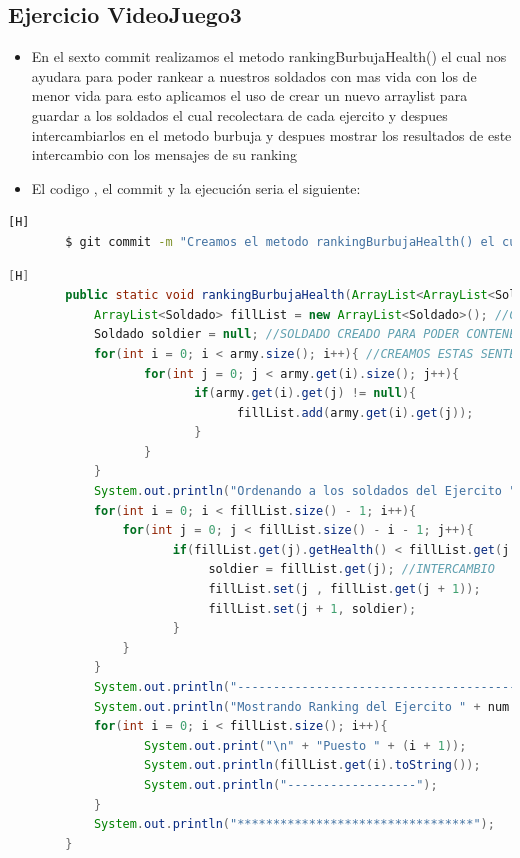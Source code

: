 \documentclass{article}
\begin{document}
	\subsection{Ejercicio VideoJuego3}
	\begin{itemize}	
		\item En el sexto commit realizamos el metodo rankingBurbujaHealth() el cual nos ayudara para poder rankear a nuestros soldados con mas vida con los de menor vida para esto aplicamos el uso de crear un nuevo arraylist para guardar a los soldados el cual recolectara de cada ejercito y despues intercambiarlos en el metodo burbuja y despues mostrar los resultados de este intercambio con los mensajes de su ranking 
		\item El codigo , el commit  y la ejecución seria el siguiente:
	\end{itemize}	
	\begin{lstlisting}[language=bash,caption={Commit}][H]
		$ git commit -m "Creamos el metodo rankingBurbujaHealth() el cual nos ayudara para poder rankear a nuestros soldados con mas vida con los de menor vida para esto aplicamos el uso de crear un nuevo arraylist para guardar a los soldados y despues intercambiarlos en el metodo burbuja y despues mostrar los resultados de este intercambio con los mensajes de su ranking
	\end{lstlisting}	
	\begin{lstlisting}[language=java,caption={Las lineas de codigos del metodo creado:}][H]
		public static void rankingBurbujaHealth(ArrayList<ArrayList<Soldado>> army, int num){
			ArrayList<Soldado> fillList = new ArrayList<Soldado>(); //CREAMOS ESTE ARRAYLIST PARA PODER GUARDAR A LOS SOLDADOS EN UN SOLO ARRAYLIST EL CUAL SEA EFECTIVO EL METODO BURBUJA 
			Soldado soldier = null; //SOLDADO CREADO PARA PODER CONTENER EL INTERCAMBIO ENTRE SOLDADOS EN EL METODO BURBUJA
			for(int i = 0; i < army.size(); i++){ //CREAMOS ESTAS SENTENCIAS PARA PODER VERIFICAR EL NUMERO DE SOLDADOS PARA DESPUES PONER EL RANKING DE PUESTOS DE CADA UNO DE ESTOS SOLDADOS
				   for(int j = 0; j < army.get(i).size(); j++){
						  if(army.get(i).get(j) != null){
								fillList.add(army.get(i).get(j));
						  }
				   }
			}
			System.out.println("Ordenando a los soldados del Ejercito " + num + " por el metodo burbuja: "); //APLICAMOS EL METODO BURBUJA CON LOS PUNTOS DE VIDA
			for(int i = 0; i < fillList.size() - 1; i++){
				for(int j = 0; j < fillList.size() - i - 1; j++){
					   if(fillList.get(j).getHealth() < fillList.get(j + 1).getHealth()){
							soldier = fillList.get(j); //INTERCAMBIO
							fillList.set(j , fillList.get(j + 1));
							fillList.set(j + 1, soldier);
					   }
				}      
			}
			System.out.println("------------------------------------------");
			System.out.println("Mostrando Ranking del Ejercito " + num + "....."); //MOSTRADOR DE RANKING DE LOS SOLDADOS
			for(int i = 0; i < fillList.size(); i++){
				   System.out.print("\n" + "Puesto " + (i + 1));
				   System.out.println(fillList.get(i).toString());
				   System.out.println("------------------");
			}
			System.out.println("*********************************");
		}
	\end{lstlisting}
\end{document}
